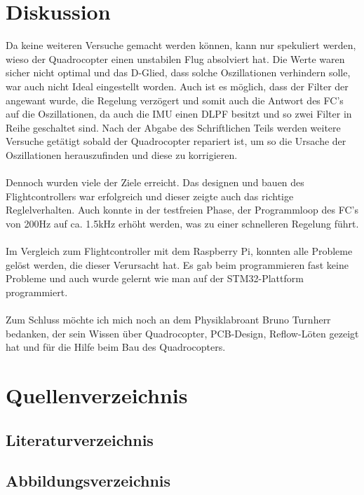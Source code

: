 \documentclass[12pt,a4paper, ngerman]{article}
\begin{document}
\section{Diskussion}
Da keine weiteren Versuche gemacht werden können, kann nur spekuliert werden, wieso der Quadrocopter einen unstabilen Flug absolviert hat. Die Werte waren sicher nicht optimal und das D-Glied, dass solche Oszillationen verhindern solle, war auch nicht Ideal eingestellt worden. Auch ist es möglich, dass der Filter der angewant wurde, die Regelung verzögert und somit auch die Antwort des FC's auf die Oszillationen, da auch die IMU einen DLPF besitzt und so zwei Filter in Reihe geschaltet sind. Nach der Abgabe des Schriftlichen Teils werden weitere Versuche getätigt sobald der Quadrocopter repariert ist, um so die Ursache der Oszillationen herauszufinden und diese zu korrigieren. \\ \\ Dennoch wurden viele der Ziele erreicht. Das designen und bauen des Flightcontrollers war erfolgreich und dieser zeigte auch das richtige Reglelverhalten. Auch konnte in der testfreien Phase, der Programmloop des FC's von 200Hz auf ca. 1.5kHz erhöht werden, was zu einer schnelleren Regelung führt.  \\ \\
Im Vergleich zum Flightcontroller mit dem Raspberry Pi, konnten alle Probleme gelöst werden, die dieser Verursacht hat. Es gab beim programmieren fast keine Probleme und auch wurde gelernt wie man auf der STM32-Plattform programmiert. \\ \\ Zum Schluss möchte ich mich noch an dem Physiklabroant Bruno Turnherr bedanken, der sein Wissen über Quadrocopter, PCB-Design, Reflow-Löten gezeigt hat und für die Hilfe beim Bau des Quadrocopters. 

\newpage
\section{Quellenverzeichnis}
\subsection{Literaturverzeichnis}
\printbibliography[heading=none]
\subsection{Abbildungsverzeichnis}
\makeatletter
{}%
\makeatother
\newpage
\end{document}
